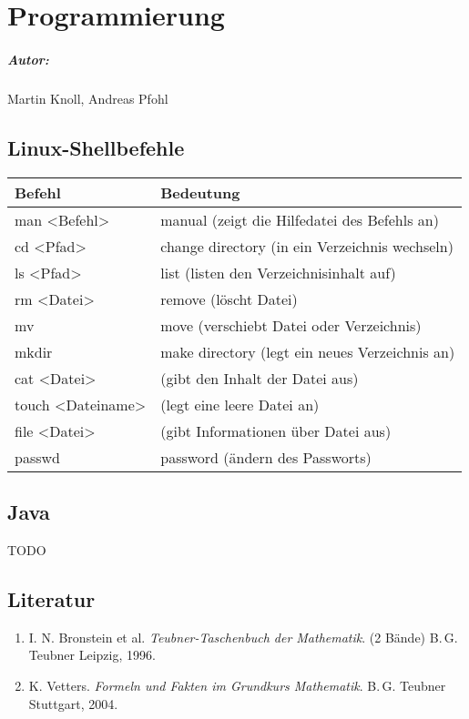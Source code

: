 
\chapter{Programmierung}\label{chap:prog}

\paragraph*{Autor:} Martin Knoll, Andreas Pfohl

\section{Linux-Shellbefehle}
{
	\begin{tabular}{ll}
	\textbf{Befehl} & \textbf{Bedeutung}\\
	\hline
	man <Befehl> & manual (zeigt die Hilfedatei des Befehls an)\\
	cd <Pfad> & change directory (in ein Verzeichnis wechseln)\\
	ls <Pfad> & list (listen den Verzeichnisinhalt auf)\\
	rm <Datei> & remove (löscht Datei)\\
	mv & move (verschiebt Datei oder Verzeichnis)\\
	mkdir & make directory (legt ein neues Verzeichnis an)\\
	cat <Datei> & (gibt den Inhalt der Datei aus)\\
	touch <Dateiname> & (legt eine leere Datei an)\\
	file <Datei> & (gibt Informationen über Datei aus)\\
	passwd & password (ändern des Passworts)
	\end{tabular}
}

\section{Java}
TODO

\section{Literatur}

\renewcommand{\labelenumi}{[\arabic{enumi}]}
\renewcommand{\theenumi}{[\arabic{enumi}]}
\begin{enumerate}
\item
I. N. Bronstein et al. \textit{Teubner-Taschenbuch der Mathematik}. (2 Bände)
B.\,G. Teubner Leipzig, 1996.

\item
K. Vetters. \textit{Formeln und Fakten im Grundkurs Mathematik}. B.\,G. Teubner Stuttgart, 2004.

\end{enumerate}
\pagestyle{scrplain}
\ofoot[]{}

\cleardoublepage
%
